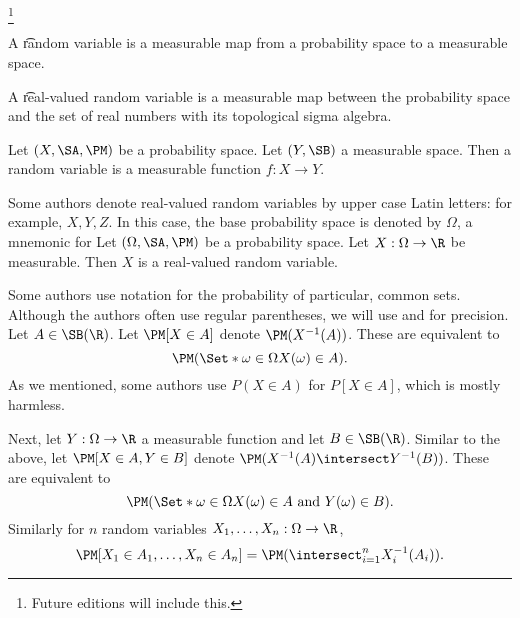 
  \ifhmode\unskip\fi\footnote{
Future editions will include this.
  }


A \t{random variable} is a measurable map from a probability space to a measurable space.

A \t{real-valued random variable} is a measurable map between the probability space and the set of real numbers with its topological sigma algebra.


Let $(X, \SA, \PM)$ be a probability space.
Let $(Y, \SB)$ a measurable space.
Then a random variable is a measurable function $f: X \to Y$.

Some authors denote real-valued random variables by upper case Latin letters:
for example, $X, Y, Z$. In this case, the base probability space is denoted by $\Omega$, a mnemonic for 
Let $(\Omega,\SA,\PM)$ be a probability space.
Let $X: \Omega \to \R$ be measurable.
Then $X$ is a real-valued random variable.

Some authors use notation for the probability of particular, common sets.
Although the authors often use regular parentheses, we will use \say{$[$} and \say{$]$} for precision.
Let $A \in \SB(\R)$.
Let $\PM[X \in A]$ denote $\PM(X^{-1}(A))$.
These are equivalent to
  \[
\PM(\Set*{\omega \in \Omega}{X(\omega) \in A}).
  \]
As we mentioned, some authors use $P(X \in A)$ for $P[X \in A]$, which is mostly harmless.

Next, let $Y: \Omega \to \R$ a measurable function and let $B \in \SB(\R)$.
Similar to the above,
let $\PM[X \in A,Y \in B]$
denote $\PM(X^{-1}(A) \intersect Y^{-1}(B))$.
These are equivalent to
  \[
\PM(\Set*{\omega \in \Omega}{X(\omega) \in A \text{ and } Y(\omega) \in B}).
  \]
Similarly for $n$ random variables $X_1, \dots, X_n: \Omega \to \R$,
  \[
\PM[X_1 \in A_1, \dots, X_n \in A_n] = \PM(\intersect_{i = 1}^{n} X_i^{-1}(A_i)).
  \]
